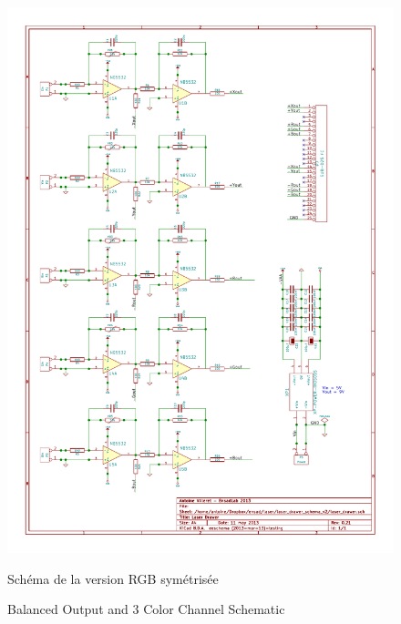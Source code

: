 \begin{appendices}
\begin{figure}[ht]
\begin{bigcenter}
\vskip -120pt
\includegraphics[scale=0.90]{../laser_drawer_schema_v2/laser_drawer.pdf}
\end{bigcenter}
\begin{fr}
\caption{Schéma de la version RGB symétrisée}
\label{fig:schema_rgb}
\end{fr}
\begin{en}
\caption{Balanced Output and 3 Color Channel Schematic}
\label{fig:schema_rgb}
\end{en}
\end{figure}


\end{appendices}
